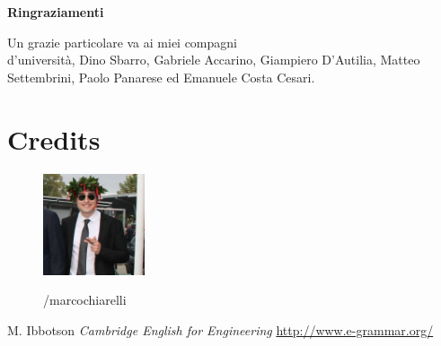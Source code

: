 \documentclass[11 pt,a4paper,twoside,openany]{book}
\begin{document}

\tableofcontents


\frontmatter

\cleardoublepage\thispagestyle{empty}
\vspace*{\fill}
\begin{center}
\bfseries Ringraziamenti
\end{center}
\bigskip

Un grazie particolare va ai miei compagni\\
d'università, Dino Sbarro, Gabriele Accarino, Giampiero D'Autilia, Matteo Settembrini, Paolo Panarese ed Emanuele Costa Cesari.

\vspace*{\fill}
\pagebreak

\mainmatter







\backmatter



\newpage

\section*{Credits}

\begin{figure}[h]
\includegraphics[width=3cm]{figures/marco.jpg}
\vspace{0.3cm}

%
\hspace{0.05cm} /marcochiarelli

\end{figure}

\begin{thebibliography}{100}
 M. Ibbotson \emph{Cambridge English for Engineering}
 \url{http://www.e-grammar.org/}
\end{thebibliography}
\end{document}
